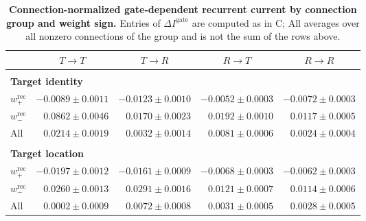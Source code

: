 \begin{table}[t]
\caption{\textbf{Connection-normalized gate-dependent recurrent current by connection group and weight sign.} Entries of \(\Delta I^{\mathrm{gate}}\) are computed as in C; All averages over all nonzero connections of the group and is not the sum of the rows above.}
\label{tab:recurrent-current}
\begin{center}
\small
\setlength{\tabcolsep}{8pt}
\begin{tabular}{lrrrr}
\multicolumn{1}{c}{} &
\multicolumn{1}{c}{\bf \(T\!\to\!T\)} &
\multicolumn{1}{c}{\bf \(T\!\to\!R\)} &
\multicolumn{1}{c}{\bf \(R\!\to\!T\)} &
\multicolumn{1}{c}{\bf \(R\!\to\!R\)}
\\ \hline \\
\multicolumn{5}{l}{\bf Target identity} \\
\(w^{\mathrm{rec}}_{+}\) & \(-0.0089 \pm 0.0011\) & \(-0.0123 \pm 0.0010\) & \(-0.0052 \pm 0.0003\) & \(-0.0072 \pm 0.0003\) \\
\(w^{\mathrm{rec}}_{-}\) & \(0.0862 \pm 0.0046\) & \(0.0170 \pm 0.0023\) & \(0.0192 \pm 0.0010\) & \(0.0117 \pm 0.0005\) \\
All & \(0.0214 \pm 0.0019\) & \(0.0032 \pm 0.0014\) & \(0.0081 \pm 0.0006\) & \(0.0024 \pm 0.0004\) \\
\hline \\
\multicolumn{5}{l}{\bf Target location} \\
\(w^{\mathrm{rec}}_{+}\) & \(-0.0197 \pm 0.0012\) & \(-0.0161 \pm 0.0009\) & \(-0.0068 \pm 0.0003\) & \(-0.0062 \pm 0.0003\) \\
\(w^{\mathrm{rec}}_{-}\) & \(0.0260 \pm 0.0013\) & \(0.0291 \pm 0.0016\) & \(0.0121 \pm 0.0007\) & \(0.0114 \pm 0.0006\) \\
All & \(0.0002 \pm 0.0009\) & \(0.0072 \pm 0.0008\) & \(0.0031 \pm 0.0005\) & \(0.0028 \pm 0.0005\) \\
\end{tabular}
\end{center}
\end{table}
